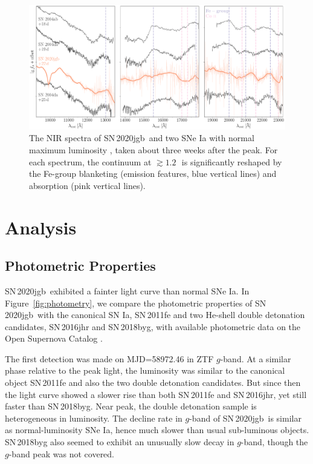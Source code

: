 \documentclass[twocolumn]{aastex631}
\newcommand\sn{SN\,2020jgb}
\begin{document}
\begin{figure}
    \centering
    \includegraphics[width=\textwidth]{NIR_spec.pdf}
    \caption{The NIR spectra of \sn\ and two SNe Ia with normal maximum luminosity \citep[SN\,2004ab and SN\,2004da,][]{Marion2009_NIR}, taken about three weeks after the peak. For each spectrum, the continuum at $\gtrsim1.2$\,\micron\ is significantly reshaped by the Fe-group blanketing (emission features, blue vertical lines) and  absorption (pink vertical lines).}
    \label{fig:NIR_spec}
\end{figure}

\section{Analysis} \label{sec:analysis}
\subsection{Photometric Properties}
\sn\ exhibited a fainter light curve than normal SNe Ia. In Figure~\ref{fig:photometry}, we compare the photometric properties of \sn\ with the canonical SN Ia, SN\,2011fe \citep{Nugent_11fe_2011} and two He-shell double detonation candidates, SN\,2016jhr and SN\,2018byg, with available photometric data on the Open Supernova Catalog \citep{Guillochon_2017}.

The first detection was made on MJD=58972.46 in ZTF $g$-band. At a similar phase relative to the peak light, the luminosity was similar to the canonical object SN\,2011fe and also the two double detonation candidates. But since then the light curve showed a slower rise than both SN\,2011fe and SN\,2016jhr, yet still faster than SN\,2018byg. Near peak, the double detonation sample is heterogeneous in luminosity. The decline rate in $g$-band of \sn\ is similar as normal-luminosity SNe Ia, hence much slower than usual sub-luminous objects. SN\,2018byg also seemed to exhibit an unusually slow decay in $g$-band, though the $g$-band peak was not covered.
\end{document}
